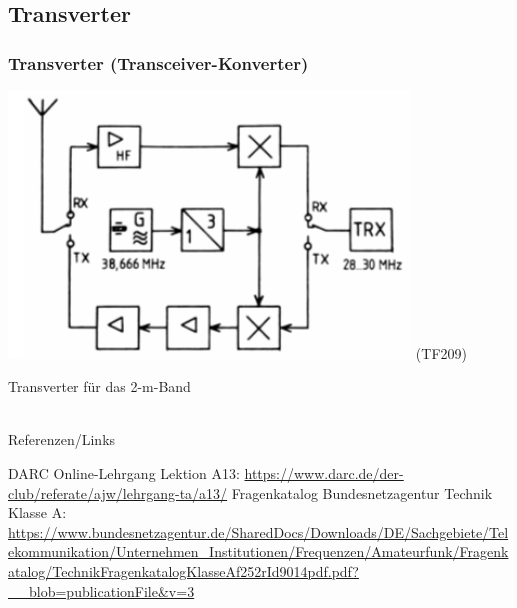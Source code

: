 \subsection{Transverter}

\begin{frame}
  \frametitle{Transverter (Transceiver-Konverter)}

  \begin{center}
    \includegraphics[width=0.8\textwidth,height=.7\textheight,keepaspectratio]{a13/TF209.png}
    {\tiny (TF209)}
  \end{center}

  Transverter für das 2-m-Band

\end{frame}

\renewcommand{\refname}{Referenzen}

\hypertarget{refs}{}
\textcolor{white}{} \\ %
\Large Referenzen/Links
\footnotesize

\begin{thebibliography}{}
    DARC Online-Lehrgang Lektion A13:
    \url{https://www.darc.de/der-club/referate/ajw/lehrgang-ta/a13/}
     Fragenkatalog Bundesnetzagentur Technik Klasse A:\\
    \url{https://www.bundesnetzagentur.de/SharedDocs/Downloads/DE/Sachgebiete/Telekommunikation/Unternehmen_Institutionen/Frequenzen/Amateurfunk/Fragenkatalog/TechnikFragenkatalogKlasseAf252rId9014pdf.pdf?__blob=publicationFile&v=3}
\end{thebibliography}


